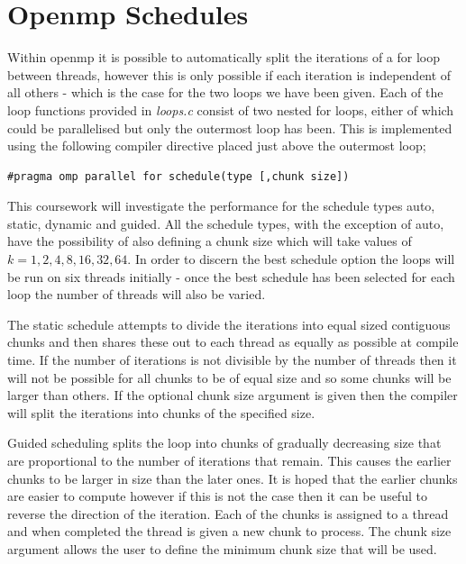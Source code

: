 \documentclass[12pt]{article} %
\begin{document}
\section{Openmp Schedules} %

Within openmp it is possible to automatically split the iterations of a for loop between threads, however this is only possible if each iteration is independent of all others - which is the case for the two loops we have been given. Each of the loop functions provided in \textit{loops.c} consist of two nested for loops, either of which could be parallelised but only the outermost loop has been. This is implemented using the following compiler directive placed just above the outermost loop;

\lstset{language=C}  %
\begin{lstlisting}
#pragma omp parallel for schedule(type [,chunk size])
\end{lstlisting}

This coursework will investigate the performance for the schedule types auto, static, dynamic and guided. All the schedule types, with the exception of auto, have the possibility of also defining a chunk size which will take values of $k = 1,2,4,8,16,32,64$. In order to discern the best schedule option the loops will be run on six threads initially - once the best schedule has been selected for each loop the number of threads will also be varied.

The static schedule attempts to divide the iterations into equal sized contiguous chunks and then shares these out to each thread as equally as possible at compile time. If the number of iterations is not divisible by the number of threads then it will not be possible for all chunks to be of equal size and so some chunks will be larger than others. If the optional chunk size argument is given then the compiler will split the iterations into chunks of the specified size.

Guided scheduling splits the loop into chunks of gradually decreasing size that are proportional to the number of iterations that remain. This causes the earlier chunks to be larger in size than the later ones. It is hoped that the earlier chunks are easier to compute however if this is not the case then it can be useful to reverse the direction of the iteration. Each of the chunks is assigned to a thread and when completed the thread is given a new chunk to process. The chunk size argument allows the user to define the minimum chunk size that will be used. 
\end{document}
